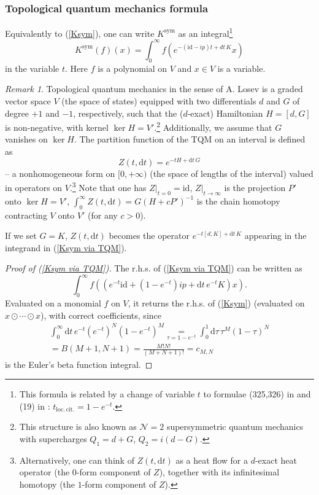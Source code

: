 \documentclass{amsart}
\theoremstyle{plain} %
\theoremstyle{definition}
\theoremstyle{remark}
\newtheorem{rem}[thm]{Remark}
\newcommand{\mc}{\mathcal}
\newcommand{\mr}{\mathrm}
\newcommand{\ra}{\rightarrow}
\newcommand{\dr}{\mathrm{d}}
\begin{document}
\subsubsection{Topological quantum mechanics formula}
Equivalently to (\ref{Ksym}), 
one can write $K^\mr{sym}$ as an integral\footnote{
This formula is related by a change of variable $t$ to formulae (325,326) in \cite{discrBF} and (19) in \cite{CMRcell}: $t_\mr{loc.\,cit.}=1-e^{-t}$.
}
\begin{equation}\label{Ksym via TQM}
    K^\mr{sym}(f)(x)= \int_0^\infty f(e^{-(\mr{id}-ip)t+dt\, K}x)
\end{equation}
in the variable $t$. Here $f$ is a polynomial on $V$ and $x\in V$ is a variable. 
\begin{rem}\label{rem: TQM}
Topological quantum mechanics in the sense of A. Losev \cite[Section 2.4]{Losev} is a graded vector space $V$ (the space of states) equipped with two differentials $d$ and $G$ of degree $+1$ and $-1$, respectively, such that the ($d$-exact) Hamiltonian $H=[d,G]$ is non-negative, with kernel $\ker H= V'$.\footnote{This structure is also known as $\mc{N}=2$ supersymmetric quantum mechanics with supercharges $Q_1=d+G$, $Q_2=i(d-G)$.} Additionally, we assume that $G$ vanishes on $\ker H$.
The partition function of the TQM on an interval is defined as
\begin{equation}\label{Z_TQM}
    Z(t,\dr t)= e^{-tH+\dr t\,G}
\end{equation}
-- a nonhomogeneous form on $[0,+\infty)$ (the space of lengths of the interval) valued in operators on $V$.\footnote{Alternatively, one can think of $Z(t,\dr t)$ as a heat flow for a $d$-exact heat operator (the $0$-form component of $Z$), together with its infinitesimal homotopy (the $1$-form component of $Z$). } 
Note that one has $Z|_{t=0}=\mr{id}$, $Z|_{t\ra \infty}$ is the projection $P'$ onto $\ker H=V'$, $\int_0^\infty Z(t,\dr t)=G (H+c P')^{-1}$ is the chain homotopy contracting $V$ onto $V'$ (for any $c>0$).

If we set $G=K$, $Z(t,\dr t)$ becomes the operator $e^{-t[d,K]+\dr t\,K}$ appearing in the integrand in (\ref{Ksym via TQM}).
\end{rem}

\begin{proof}[Proof of (\ref{Ksym via TQM})]
The r.h.s. of (\ref{Ksym via TQM}) can be written as
\begin{equation}\label{Ksym TQM integral 2}
    \int_0^\infty f((e^{-t}\mr{id}+(1-e^{-t})ip+\dr t\, e^{-t}K)x).
\end{equation}
Evaluated on a monomial $f$ on $V$, it returns the r.h.s. of (\ref{Ksym}) (evaluated on $x\odot\cdots \odot x$), with correct coefficients, since 
\begin{multline}
\int_0^\infty \dr t\, e^{-t} (e^{-t})^{N} (1-e^{-t})^M\underset{\tau=1-e^{-t}}{=}\int_0^1 \dr \tau\, \tau^M (1-\tau)^N\\=B(M+1,N+1)=\frac{M!N!}{(M+N+1)!}=c_{M,N}
\end{multline}
is the Euler's beta function integral.
\end{proof}
\end{document}
